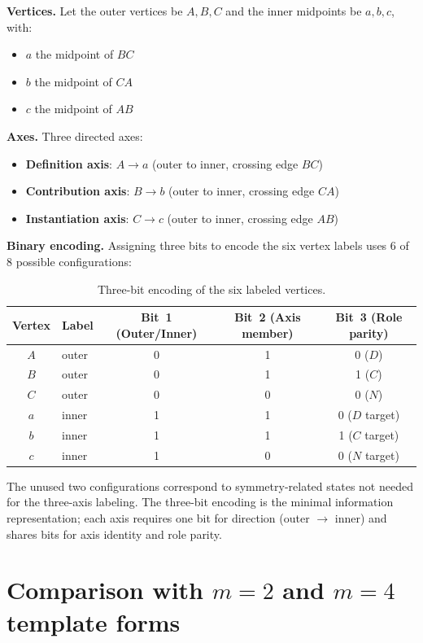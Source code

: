\documentclass[12pt]{article}
\theoremstyle{definition}
\theoremstyle{remark}
\begin{document}
\textbf{Vertices.}  Let the outer vertices be $A, B, C$ and the inner midpoints be
$a, b, c$, with:
\begin{itemize}
  \item $a$ the midpoint of $BC$
  \item $b$ the midpoint of $CA$
  \item $c$ the midpoint of $AB$
\end{itemize}

\textbf{Axes.}  Three directed axes:
\begin{itemize}
  \item \textbf{Definition axis}: $A \to a$ (outer to inner, crossing edge $BC$)
  \item \textbf{Contribution axis}: $B \to b$ (outer to inner, crossing edge $CA$)
  \item \textbf{Instantiation axis}: $C \to c$ (outer to inner, crossing edge $AB$)
\end{itemize}

\textbf{Binary encoding.}  Assigning three bits to encode the six vertex labels uses 6
of 8 possible configurations:

\begin{table}[ht]
\centering
\caption{Three-bit encoding of the six labeled vertices.\label{tab:bits}}
\renewcommand{\arraystretch}{1.2}
\begin{tabular}{clccc}
\toprule
Vertex & Label & Bit~1 (Outer/Inner) & Bit~2 (Axis member) & Bit~3 (Role parity) \\
\midrule
$A$ & outer & 0 & 1 & 0 ($D$) \\
$B$ & outer & 0 & 1 & 1 ($C$) \\
$C$ & outer & 0 & 0 & 0 ($N$) \\
$a$ & inner & 1 & 1 & 0 ($D$ target) \\
$b$ & inner & 1 & 1 & 1 ($C$ target) \\
$c$ & inner & 1 & 0 & 0 ($N$ target) \\\bottomrule
\end{tabular}
\end{table}

The unused two configurations correspond to symmetry-related states not needed for the
three-axis labeling.  The three-bit encoding is the minimal information representation;
each axis requires one bit for direction (outer $\to$ inner) and shares bits for axis
identity and role parity.

\section{Comparison with $m = 2$ and $m = 4$ template forms}\label{app:templates}
\end{document}
